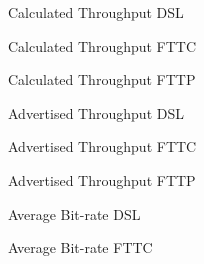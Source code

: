 \documentclass[10pt,sigconf]{acmart}
\begin{document}

\begin{figure}
    \centering
    \caption{Calculated Throughput DSL}
    \label{fig:throughput-precise-DSL}
\end{figure}

\begin{figure}
    \centering
    \caption{Calculated Throughput FTTC}
    \label{fig:throughput-precise-FTTC}
\end{figure}

\begin{figure}
    \centering
    \caption{Calculated Throughput FTTP}
    \label{fig:throughput-precise-FTTP}
\end{figure}

\begin{figure}
    \centering
    \caption{Advertised Throughput DSL}
    \label{fig:throughput-safe-DSL}
\end{figure}

\begin{figure}
    \centering
    \caption{Advertised Throughput FTTC}
    \label{fig:throughput-safe-FTTC}
\end{figure}

\begin{figure}
    \centering
    \caption{Advertised Throughput FTTP}
    \label{fig:throughput-safe-FTTP}
\end{figure}

\begin{figure}
    \centering
    \caption{Average Bit-rate DSL}
    \label{fig:avg-bitrate-DSL}
\end{figure}

\begin{figure}
    \centering
    \caption{Average Bit-rate FTTC}
    \label{fig:avg-bitrate-FTTC}
\end{figure}
\end{document}

